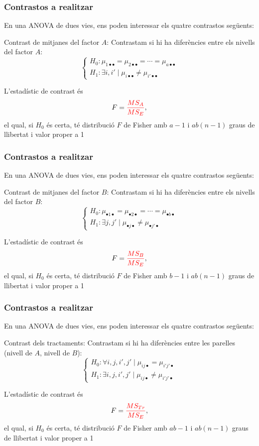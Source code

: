 \documentclass[12pt,t]{beamer}
\newcommand{\red}[1]{\textcolor{red}{#1}}
\renewcommand{\emph}[1]{{\color{red}#1}}
\theoremstyle{plain}
\theoremstyle{definition}
\begin{document}
\begin{frame}
\frametitle{Contrastos a realitzar}

En una ANOVA de dues vies, ens poden interessar 
els quatre contrastos següents:
\bigskip

 \emph{Contrast de mitjanes del factor $A$}: Contrastam si  hi ha diferències entre els nivells del factor $A$:
$$
\left\{
\begin{array}{l}
H_0 : \mu_{1\bullet\bullet}=\mu_{2\bullet\bullet}=\cdots
=\mu_{a\bullet\bullet} \\
H_1 :  \exists i,i'\mid  \mu_{i\bullet\bullet}
\not = \mu_{i'\bullet\bullet}
\end{array}
\right.
$$
\medskip

L'estadístic de contrast és
$$
F=\red{\frac{MS_A}{MS_E}},
$$
el qual, si $H_0$ és certa, té
distribució $F$ de Fisher amb $a-1$ i $ab(n-1)$ graus de llibertat i valor proper a 1

\end{frame}


\begin{frame}
\frametitle{Contrastos a realitzar}

En una ANOVA de dues vies, ens poden interessar 
els quatre contrastos següents:
\bigskip

 \emph{Contrast de mitjanes del factor $B$}: Contrastam si  hi ha diferències entre els nivells del factor $B$:
$$
\left\{
\begin{array}{l}
H_0 : \mu_{\bullet 1\bullet}=\mu_{\bullet 2\bullet}=\cdots =\mu_{ \bullet
b\bullet} \\
H_1 :  \exists j,j'\mid  \mu_{\bullet j\bullet}
\not = \mu_{\bullet j'\bullet}
\end{array}
\right.
$$
\medskip

L'estadístic de contrast és
$$
F=\red{\frac{MS_B}{MS_E}},
$$
el qual, si $H_0$ és certa, té
distribució $F$ de Fisher amb $b-1$ i $ab(n-1)$ graus de llibertat i valor proper a 1

\end{frame}



\begin{frame}
\frametitle{Contrastos a realitzar}

En una ANOVA de dues vies, ens poden interessar 
els quatre contrastos següents:
\bigskip

 \emph{Contrast dels tractaments}: Contrastam si  hi ha diferències entre les parelles (nivell de  $A$, nivell de  $B$):
$$
\left\{
\begin{array}{l}
H_0 : \forall i,j,i',j'\mid \mu_{ij\bullet}=\mu_{i'j'\bullet} \\
H_1 :  \exists i,j,i',j'\mid \mu_{ij\bullet}\neq \mu_{i'j'\bullet}
\end{array}
\right.
$$
\medskip

L'estadístic de contrast és
$$
F=\red{\frac{MS_{Tr}}{MS_E}},
$$
el qual, si $H_0$ és certa, té
distribució $F$ de Fisher amb $ab-1$ i $ab(n-1)$ graus de llibertat i valor proper a 1

\end{frame}
\end{document}
